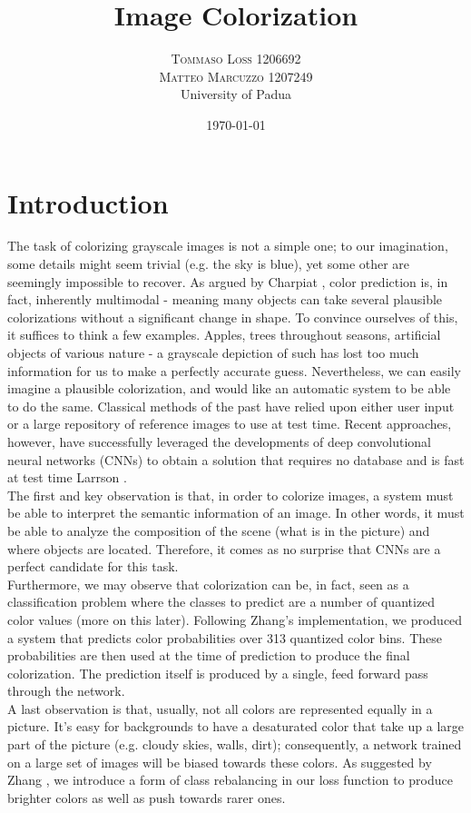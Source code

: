 \documentclass[twoside,twocolumn]{article}
\title{Image Colorization} %
\author{%
\textsc{Tommaso Loss 1206692} \\
\textsc{Matteo Marcuzzo 1207249}
 \\[1ex] %
\normalsize University of Padua \\ %
}
\date{\today} %
\begin{document}
\maketitle


\section{Introduction}

The task of colorizing grayscale images is not a simple one; to our imagination, some details might seem trivial (e.g. the sky is blue), yet some other are seemingly impossible to recover. As argued by Charpiat \cite{Charpiat:2008}, color prediction is, in fact, inherently multimodal - meaning many objects can take several plausible colorizations without a significant change in shape. To convince ourselves of this, it suffices to think a few examples. Apples, trees throughout seasons, artificial objects of various nature - a grayscale depiction of such has lost too much information for us to make a perfectly accurate guess. Nevertheless, we can easily imagine a plausible colorization, and would like an automatic system to be able to do the same.
Classical methods of the past have relied upon either user input or a large repository of reference images to use at test time. Recent approaches, however, have successfully leveraged the developments of deep convolutional neural networks (CNNs) to obtain a solution that requires no database and is fast at test time Larrson \cite{Larsson:2016}.\\
The first and key observation is that, in order to colorize images, a system must be able to interpret the semantic information of an image. In other words, it must be able to analyze the composition of the scene (what is in the picture) and where objects are located. Therefore, it comes as no surprise that CNNs are a perfect candidate for this task.\\
Furthermore, we may observe that colorization can be, in fact, seen as a classification problem where the classes to predict are a number of quantized color values (more on this later). Following Zhang’s \cite{Zhang:2016} implementation, we produced a system that predicts color probabilities over 313 quantized color bins. These probabilities are then used at the time of prediction to produce the final colorization. The prediction itself is produced by a single, feed forward pass through the network. \\
A last observation is that, usually, not all colors are represented equally in a picture. It’s easy for backgrounds to have a desaturated color that take up a large part of the picture (e.g. cloudy skies, walls, dirt); consequently, a network trained on a large set of images will be biased towards these colors. As suggested by Zhang \cite{Zhang:2016}, we introduce a form of class rebalancing in our loss function to produce brighter colors as well as push towards rarer ones.
\end{document}
